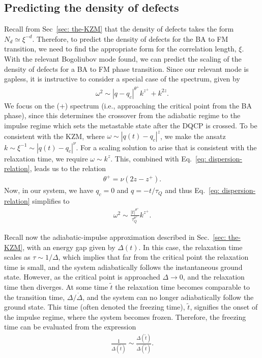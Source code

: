 \subsection{Predicting the density of defects}
Recall from Sec~\ref{sec: the-KZM} that the density of defects takes the form
\(N_d \simeq \xi^{-d}\).
Therefore, to predict the density of defects for the BA to FM transition, we
need to find the appropriate form for the correlation length, \(\xi \).
With the relevant Bogoliubov mode found, we can predict the scaling of the
density of defects for a BA to FM phase transition.
Since our relevant mode is gapless, it is instructive to consider a special case
of the spectrum, given by
\begin{align}\label{eq: dispersion-relation}
    \omega^2 \sim |q-q_c|^{\theta^+}k^{z^+}+k^{2z}.
\end{align}
We focus on the (+) spectrum (i.e., approaching the critical point from the BA
phase), since this determines the crossover from the adiabatic regime to the
impulse regime which sets the metastable state after the DQCP is crossed.
To be consistent with the KZM, where \(\omega \sim |q(t)-q_c|^{z}\), we make
the ansatz \(k \sim \xi^{-1} \sim |q(t)-q_c|^{\nu}\).
For a scaling solution to arise that is consistent with the relaxation time,
we require \(\omega \sim k^z\).
This, combined with Eq.~\eqref{eq: dispersion-relation}, leads us to the
relation
\begin{align}
    \theta^+ = \nu (2z-z^+).
\end{align}
Now, in our system, we have \(q_c = 0\) and \(q = -t/\tau_Q\) and thus
Eq.~\eqref{eq: dispersion-relation} simplifies to
\begin{align}\label{eq: dispersion-relation-simplified}
    \omega^2 \sim \frac{|t|^{\theta^+}}{\tau_Q^{\theta^+}}k^{z^+}.    
\end{align}

Recall now the adiabatic-impulse approximation described in
Sec.~\ref{sec: the-KZM}, with an energy gap given by \(\Delta(t)\).
In this case, the relaxation time scales as \(\tau \sim 1/\Delta \), which
implies that far from the critical point the relaxation time is small, and the
system adiabatically follows the instantaneous ground state.
However, as the critical point is approached \(\Delta \rightarrow 0\), and the
relaxation time then diverges.
At some time \(\tilde{t}\) the relaxation time becomes comparable to the
transition time, \(\Delta / \dot{\Delta}\), and the system can no longer
adiabatically follow the ground state.
This time (often denoted the freezing time), \(\tilde{t}\), signifies the onset
of the impulse regime, where the system becomes frozen.
Therefore, the freezing time can be evaluated from the expression
\begin{align}
    \frac{1}{\Delta(\tilde{t})} \sim
    \frac{\Delta(\tilde{t})}{\dot{\Delta}(\tilde{t})} .
\end{align}

